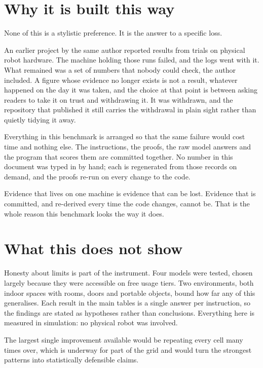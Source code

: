 \documentclass[11pt,a4paper]{article}
\begin{document}
\section{Why it is built this way}

None of this is a stylistic preference. It is the answer to a specific loss.

An earlier project by the same author reported results from trials on physical robot hardware. The machine holding those runs failed, and the logs went with it. What remained was a set of numbers that nobody could check, the author included. A figure whose evidence no longer exists is not a result, whatever happened on the day it was taken, and the choice at that point is between asking readers to take it on trust and withdrawing it. It was withdrawn, and the repository that published it still carries the withdrawal in plain sight rather than quietly tidying it away.

Everything in this benchmark is arranged so that the same failure would cost time and nothing else. The instructions, the proofs, the raw model answers and the program that scores them are committed together. No number in this document was typed in by hand; each is regenerated from those records on demand, and the proofs re-run on every change to the code.

\begin{quotebox}
Evidence that lives on one machine is evidence that can be lost. Evidence that is committed, and re-derived every time the code changes, cannot be. That is the whole reason this benchmark looks the way it does.
\end{quotebox}

\section{What this does not show}

Honesty about limits is part of the instrument. Four models were tested, chosen largely because they were accessible on free usage tiers. Two environments, both indoor spaces with rooms, doors and portable objects, bound how far any of this generalises. Each result in the main tables is a single answer per instruction, so the findings are stated as hypotheses rather than conclusions. Everything here is measured in simulation: no physical robot was involved.

The largest single improvement available would be repeating every cell many times over, which is underway for part of the grid and would turn the strongest patterns into statistically defensible claims.
\end{document}
